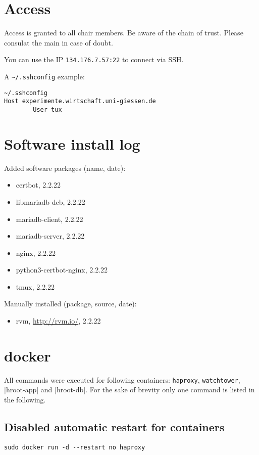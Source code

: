 \documentclass{article}
\begin{document}
\section{Access}
Access is granted to all chair members. Be aware of the chain of trust. Please consulat the main in case of doubt.

You can use the IP \verb|134.176.7.57:22| to connect via SSH.

A \verb|~/.sshconfig| example:
\begin{lstlisting}
~/.sshconfig
Host experimente.wirtschaft.uni-giessen.de                                        
        User tux
\end{lstlisting}

\section{Software install log}
Added software packages (name, date):
\begin{itemize}
    \item certbot, 2.2.22
    \item libmariadb-deb, 2.2.22
    \item mariadb-client, 2.2.22
    \item mariadb-server, 2.2.22
    \item nginx, 2.2.22
    \item python3-certbot-nginx, 2.2.22
    \item tmux, 2.2.22
\end{itemize}

Manually installed (package, source, date):
\begin{itemize}
    \item rvm, \url{http://rvm.io/}, 2.2.22
\end{itemize}

\section{docker}

All commands were executed for following containers: \verb|haproxy|, \verb|watchtower|, |hroot-app| and |hroot-db|. For the sake of brevity only one command is listed in the following.

\subsection{Disabled automatic restart for containers}

\begin{lstlisting}
sudo docker run -d --restart no haproxy
\end{lstlisting}
\end{document}
